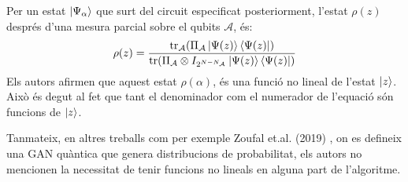 Per un estat $\ket{\Psi_\alpha}$ que surt del circuit especificat posteriorment, l'estat $\rho(z)$ després d'una mesura parcial sobre el qubits $\mathcal{A}$, és:
$$
\rho(z) = \frac{\tr_\mathcal{A}(\Pi_\mathcal{A}\ket{\Psi(z)}\bra{\Psi(z)})}{\tr(\Pi_\mathcal{A} \otimes I_{2^{N-N_\mathcal{A}}}\ket{\Psi(z)}\bra{\Psi(z)})}
$$
 Els autors afirmen que aquest estat $\rho(\alpha)$, és una funció no lineal de l'estat $\ket{z}$. Això és degut al fet que tant el denominador com el numerador de l'equació són funcions de $\ket{z}$.

Tanmateix, en altres treballs com per exemple Zoufal et.al. (2019) \cite{QGAN_IBM}, on es defineix una GAN quàntica que genera distribucions de probabilitat, els autors no mencionen la necessitat de tenir funcions no lineals en alguna part de l'algoritme.


